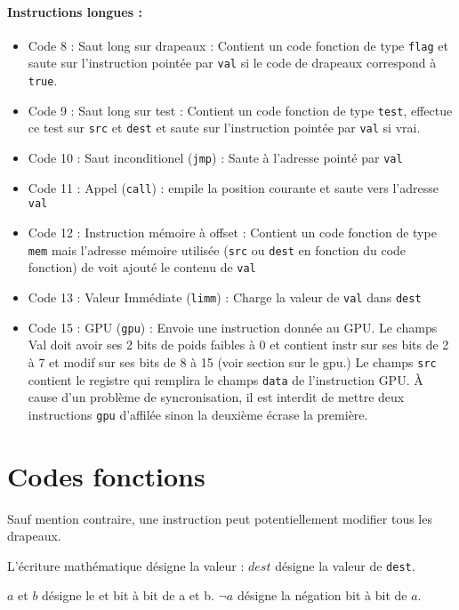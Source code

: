 \documentclass[12pt]{article}
\begin{document}
\paragraph{Instructions longues :}
\begin{itemize}
\item Code 8 : Saut long sur drapeaux : Contient un code fonction de type \verb!flag!
  et saute sur l'instruction pointée par \verb!val! si le code de drapeaux
  correspond à \verb!true!.
\item Code 9 : Saut long sur test : Contient un code fonction de type
  \verb!test!, effectue ce test sur \verb!src! et \verb!dest! et saute
  sur l'instruction pointée par \verb!val! si vrai.
\item Code 10 : Saut inconditionel (\verb!jmp!) : Saute à l'adresse pointé par \verb!val!
\item Code 11 : Appel (\verb!call!) : empile la position courante et saute vers l'adresse
  \verb!val!
\item Code 12 : Instruction mémoire à offset : Contient un code fonction de type
  \verb!mem! mais l'adresse mémoire utilisée (\verb!src! ou \verb!dest! en
  fonction du code fonction) de voit ajouté le contenu de \verb!val!
\item Code 13 : Valeur Immédiate (\verb!limm!) : Charge la valeur de \verb!val! dans \verb!dest! 
\item Code 15 : GPU (\verb!gpu!) : Envoie une instruction donnée au GPU. Le
  champs Val doit avoir ses 2 bits de poids faibles à 0 et contient instr sur
  ses bits de 2 à 7 et modif sur ses bits de 8 à 15 (voir section sur le gpu.)
  Le champs \verb!src! contient le registre qui remplira le champs \verb!data!
  de l'instruction GPU. À cause d'un problème de syncronisation, il est interdit
  de mettre deux instructions \verb!gpu! d'affilée sinon la deuxième écrase la première.
\end{itemize}

\section{Codes fonctions}

Sauf mention contraire, une instruction peut potentiellement modifier tous les
drapeaux.

L'écriture mathématique désigne la valeur : $dest$ désigne la valeur de \verb!dest!.

$a$ et $b$ désigne le \og et \fg{} bit à bit de a et b. $\neg a$ désigne la
négation bit à bit de $a$.
\end{document}
